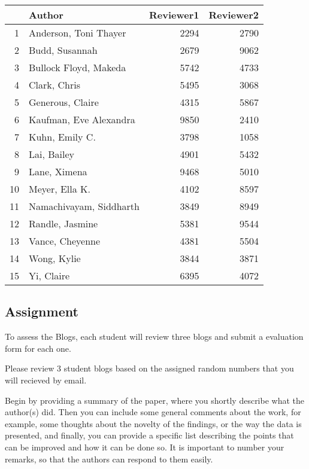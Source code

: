 \documentclass{tufte-handout}\usepackage[]{graphicx}\usepackage[]{color}
\begin{document}
\begin{table}[ht]
\centering
\begin{tabular}{rlrr}
  \hline
 & Author & Reviewer1 & Reviewer2 \\ 
  \hline
1 & Anderson, Toni Thayer & 2294 & 2790 \\ 
  2 & Budd, Susannah & 2679 & 9062 \\ 
  3 & Bullock Floyd, Makeda & 5742 & 4733 \\ 
  4 & Clark, Chris & 5495 & 3068 \\ 
  5 & Generous, Claire & 4315 & 5867 \\ 
  6 & Kaufman, Eve Alexandra & 9850 & 2410 \\ 
  7 & Kuhn, Emily C. & 3798 & 1058 \\ 
  8 & Lai, Bailey & 4901 & 5432 \\ 
  9 & Lane, Ximena & 9468 & 5010 \\ 
  10 & Meyer, Ella K. & 4102 & 8597 \\ 
  11 & Namachivayam, Siddharth & 3849 & 8949 \\ 
  12 & Randle, Jasmine & 5381 & 9544 \\ 
  13 & Vance, Cheyenne & 4381 & 5504 \\ 
  14 & Wong, Kylie & 3844 & 3871 \\ 
  15 & Yi, Claire & 6395 & 4072 \\ 
   \hline
\end{tabular}
\end{table}



\subsection{Assignment}

To assess the Blogs, each student will review three blogs and submit a evaluation form for each one. 

Please review 3 student blogs based on the assigned random numbers that you will recieved by email. 

Begin by providing a summary of the paper, where you shortly describe what the author(s) did. Then you can include some general comments about the work, for example, some thoughts about the novelty of the findings, or the way the data is presented, and finally, you can provide a specific list describing the points that can be improved and how it can be done so. It is important to number your remarks, so that the authors can respond to them easily.
\end{document}
